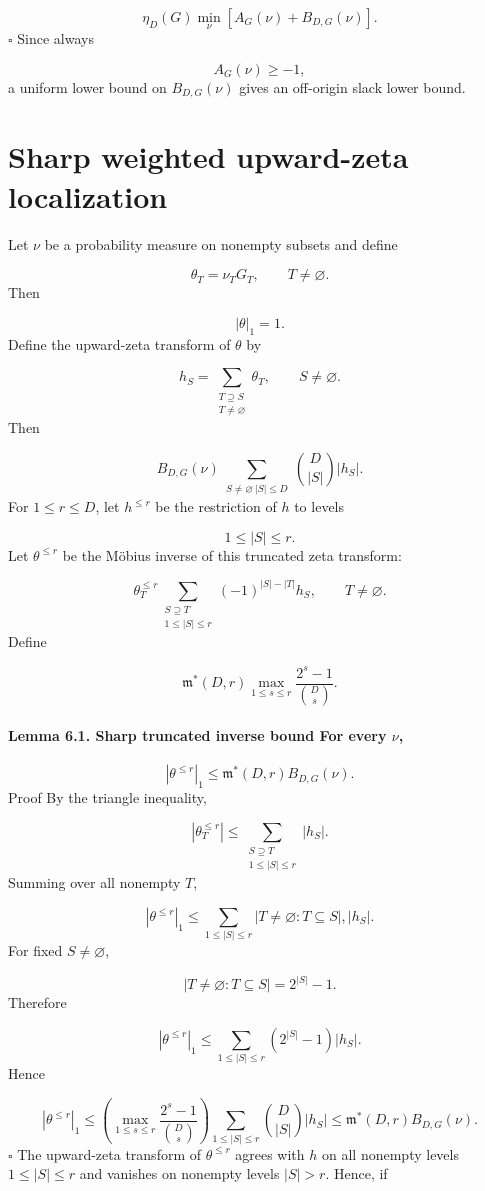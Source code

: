 \documentclass[11pt]{article}
\theoremstyle{definition}
\begin{document}
\[
\eta_D(G)
\min_\nu
\left[
A_G(\nu)+B_{D,G}(\nu)
\right].
\]
$\square$ Since always

\[
A_G(\nu)\ge-1,
\]
a uniform lower bound on $B_{D,G}(\nu)$ gives an off-origin slack lower bound.

\section{Sharp weighted upward-zeta localization}
Let $\nu$ be a probability measure on nonempty subsets and define

\[
\theta_T=\nu_TG_T,
\qquad T\ne\varnothing.
\]
Then

\[
|\theta|_1=1.
\]
Define the upward-zeta transform of $\theta$ by

\[
h_S=
\sum_{\substack{T\supseteq S\\ T\ne\varnothing}}\theta_T,
\qquad S\ne\varnothing.
\]
Then

\[
B_{D,G}(\nu)
\sum_{\substack{S\ne\varnothing\ |S|\le D}}
\binom{D}{|S|}|h_S|.
\]
For $1\le r\le D$, let $h^{\le r}$ be the restriction of $h$ to levels

\[
1\le |S|\le r.
\]
Let $\theta^{\le r}$ be the Möbius inverse of this truncated zeta transform:

\[
\theta_T^{\le r}
\sum_{\substack{S\supseteq T\\ 1\le |S|\le r}}
(-1)^{|S|-|T|}h_S,
\qquad T\ne\varnothing.
\]
Define

\[
\mathfrak m^*(D,r)
\max_{1\le s\le r}
\frac{2^s-1}{\binom{D}{s}}.
\]
\paragraph{Lemma 6.1. Sharp truncated inverse bound For every $\nu$,}
\[
|\theta^{\le r}|_1
\le
\mathfrak m^*(D,r)B_{D,G}(\nu).
\]
Proof By the triangle inequality,

\[
|\theta_T^{\le r}|
\le
\sum_{\substack{S\supseteq T\\ 1\le |S|\le r}}|h_S|.
\]
Summing over all nonempty $T$,

\[
|\theta^{\le r}|_1
\le
\sum_{1\le |S|\le r}
|{T\ne\varnothing:T\subseteq S}|,|h_S|.
\]
For fixed $S\ne\varnothing$,

\[
|{T\ne\varnothing:T\subseteq S}|=2^{|S|}-1.
\]
Therefore

\[
|\theta^{\le r}|_1
\le
\sum_{1\le |S|\le r}(2^{|S|}-1)|h_S|.
\]
Hence

\[
|\theta^{\le r}|_1
\le
\left(
\max_{1\le s\le r}
\frac{2^s-1}{\binom{D}{s}}
\right)
\sum_{1\le |S|\le r}
\binom{D}{|S|}|h_S|
\le
\mathfrak m^*(D,r)B_{D,G}(\nu).
\]
$\square$ The upward-zeta transform of $\theta^{\le r}$ agrees with $h$ on all nonempty levels $1\le |S|\le r$ and vanishes on nonempty levels $|S|>r$. Hence, if
\end{document}
